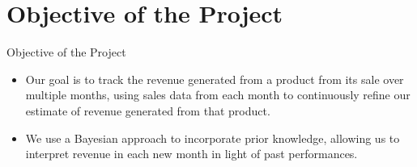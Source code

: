 \section{Objective of the Project}

\begin{frame}{Objective of the Project}

  \begin{itemize}
    \item Our goal is to track the revenue generated from a product from its sale over multiple months, using sales data from each month to continuously refine our estimate of revenue generated from that product.
    \item We use a Bayesian approach to incorporate prior knowledge, allowing us to interpret revenue in each new month in light of past performances.
  \end{itemize}
  
\end{frame}
